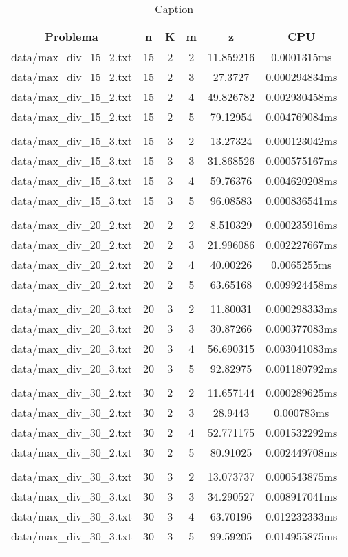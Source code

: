 \begin{table}[h]
\centering
\begin{tabular}{|c|c|c|c|c|c|}
\hline
Problema &  n &  K &  m &  z &  CPU \\
\hline
data/max\_div\_15\_2.txt &  15 &  2 &  2 &  11.859216 &  0.0001315ms \\
data/max\_div\_15\_2.txt &  15 &  2 &  3 &  27.3727 &  0.000294834ms \\
data/max\_div\_15\_2.txt &  15 &  2 &  4 &  49.826782 &  0.002930458ms \\
data/max\_div\_15\_2.txt &  15 &  2 &  5 &  79.12954 &  0.004769084ms \\
 \\
data/max\_div\_15\_3.txt &  15 &  3 &  2 &  13.27324 &  0.000123042ms \\
data/max\_div\_15\_3.txt &  15 &  3 &  3 &  31.868526 &  0.000575167ms \\
data/max\_div\_15\_3.txt &  15 &  3 &  4 &  59.76376 &  0.004620208ms \\
data/max\_div\_15\_3.txt &  15 &  3 &  5 &  96.08583 &  0.000836541ms \\
 \\
data/max\_div\_20\_2.txt &  20 &  2 &  2 &  8.510329 &  0.000235916ms \\
data/max\_div\_20\_2.txt &  20 &  2 &  3 &  21.996086 &  0.002227667ms \\
data/max\_div\_20\_2.txt &  20 &  2 &  4 &  40.00226 &  0.0065255ms \\
data/max\_div\_20\_2.txt &  20 &  2 &  5 &  63.65168 &  0.009924458ms \\
 \\
data/max\_div\_20\_3.txt &  20 &  3 &  2 &  11.80031 &  0.000298333ms \\
data/max\_div\_20\_3.txt &  20 &  3 &  3 &  30.87266 &  0.000377083ms \\
data/max\_div\_20\_3.txt &  20 &  3 &  4 &  56.690315 &  0.003041083ms \\
data/max\_div\_20\_3.txt &  20 &  3 &  5 &  92.82975 &  0.001180792ms \\
 \\
data/max\_div\_30\_2.txt &  30 &  2 &  2 &  11.657144 &  0.000289625ms \\
data/max\_div\_30\_2.txt &  30 &  2 &  3 &  28.9443 &  0.000783ms \\
data/max\_div\_30\_2.txt &  30 &  2 &  4 &  52.771175 &  0.001532292ms \\
data/max\_div\_30\_2.txt &  30 &  2 &  5 &  80.91025 &  0.002449708ms \\
 \\
data/max\_div\_30\_3.txt &  30 &  3 &  2 &  13.073737 &  0.000543875ms \\
data/max\_div\_30\_3.txt &  30 &  3 &  3 &  34.290527 &  0.008917041ms \\
data/max\_div\_30\_3.txt &  30 &  3 &  4 &  63.70196 &  0.012232333ms \\
data/max\_div\_30\_3.txt &  30 &  3 &  5 &  99.59205 &  0.014955875ms \\
 \\
\hline
\end{tabular}
\caption{Caption}
\label{tab:my_table}
\end{table}